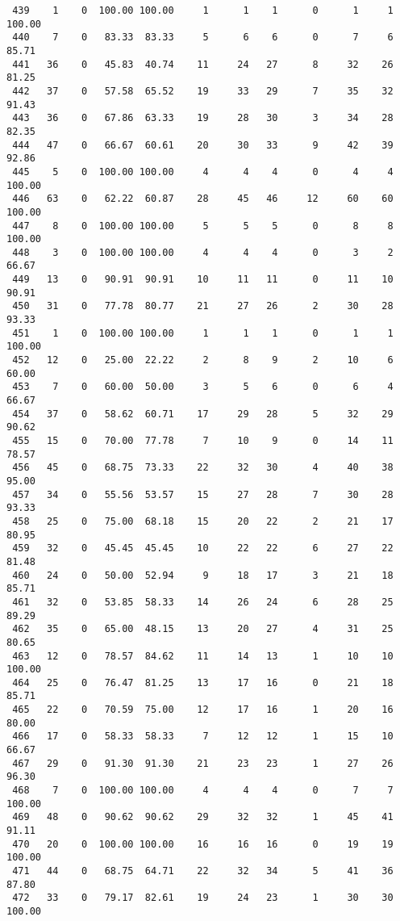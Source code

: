 \begin{verbatim}
 439    1    0  100.00 100.00     1      1    1      0      1     1   100.00
 440    7    0   83.33  83.33     5      6    6      0      7     6    85.71
 441   36    0   45.83  40.74    11     24   27      8     32    26    81.25
 442   37    0   57.58  65.52    19     33   29      7     35    32    91.43
 443   36    0   67.86  63.33    19     28   30      3     34    28    82.35
 444   47    0   66.67  60.61    20     30   33      9     42    39    92.86
 445    5    0  100.00 100.00     4      4    4      0      4     4   100.00
 446   63    0   62.22  60.87    28     45   46     12     60    60   100.00
 447    8    0  100.00 100.00     5      5    5      0      8     8   100.00
 448    3    0  100.00 100.00     4      4    4      0      3     2    66.67
 449   13    0   90.91  90.91    10     11   11      0     11    10    90.91
 450   31    0   77.78  80.77    21     27   26      2     30    28    93.33
 451    1    0  100.00 100.00     1      1    1      0      1     1   100.00
 452   12    0   25.00  22.22     2      8    9      2     10     6    60.00
 453    7    0   60.00  50.00     3      5    6      0      6     4    66.67
 454   37    0   58.62  60.71    17     29   28      5     32    29    90.62
 455   15    0   70.00  77.78     7     10    9      0     14    11    78.57
 456   45    0   68.75  73.33    22     32   30      4     40    38    95.00
 457   34    0   55.56  53.57    15     27   28      7     30    28    93.33
 458   25    0   75.00  68.18    15     20   22      2     21    17    80.95
 459   32    0   45.45  45.45    10     22   22      6     27    22    81.48
 460   24    0   50.00  52.94     9     18   17      3     21    18    85.71
 461   32    0   53.85  58.33    14     26   24      6     28    25    89.29
 462   35    0   65.00  48.15    13     20   27      4     31    25    80.65
 463   12    0   78.57  84.62    11     14   13      1     10    10   100.00
 464   25    0   76.47  81.25    13     17   16      0     21    18    85.71
 465   22    0   70.59  75.00    12     17   16      1     20    16    80.00
 466   17    0   58.33  58.33     7     12   12      1     15    10    66.67
 467   29    0   91.30  91.30    21     23   23      1     27    26    96.30
 468    7    0  100.00 100.00     4      4    4      0      7     7   100.00
 469   48    0   90.62  90.62    29     32   32      1     45    41    91.11
 470   20    0  100.00 100.00    16     16   16      0     19    19   100.00
 471   44    0   68.75  64.71    22     32   34      5     41    36    87.80
 472   33    0   79.17  82.61    19     24   23      1     30    30   100.00

\end{verbatim}
